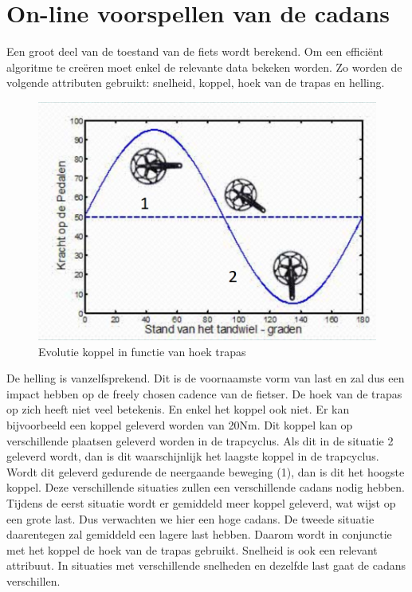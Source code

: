\section{On-line voorspellen van de cadans}
Een groot deel van de toestand van de fiets wordt berekend. Om een efficiënt algoritme te creëren moet enkel de relevante data bekeken worden. Zo worden de volgende attributen gebruikt: snelheid, koppel, hoek van de trapas en helling. 
\\

\begin{figure}
  \centering
  \includegraphics[width=\linewidth]{images/trapcyclus.png}
  \caption{Evolutie koppel in functie van hoek trapas}
  \label{fig:Evolutie koppel in functie van hoek trapas}
\end{figure}
\noindent De helling is vanzelfsprekend. Dit is de voornaamste vorm van last en zal dus een impact hebben op de freely chosen cadence van de fietser. De hoek van de trapas op zich heeft niet veel betekenis. En enkel het koppel ook niet. Er kan bijvoorbeeld een koppel geleverd worden van 20Nm. Dit koppel kan op verschillende plaatsen geleverd worden in de trapcyclus. Als dit in de situatie 2 geleverd wordt, dan is dit waarschijnlijk het laagste koppel in de trapcyclus. Wordt dit geleverd gedurende de neergaande beweging (1), dan is dit het hoogste koppel. Deze verschillende situaties zullen een verschillende cadans nodig hebben. Tijdens de eerst situatie wordt er gemiddeld meer koppel geleverd, wat wijst op een grote last. Dus verwachten we hier een hoge cadans. De tweede situatie daarentegen zal gemiddeld een lagere last hebben. Daarom wordt in conjunctie met het koppel de hoek van de trapas gebruikt. Snelheid is ook een relevant attribuut. In situaties met verschillende snelheden en dezelfde last gaat de cadans verschillen.
\newpage
